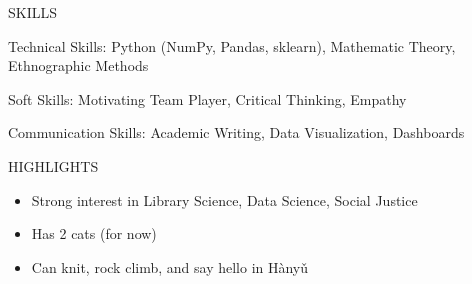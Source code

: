 \documentclass{article}
\newcommand{\sectionSpace}{\vspace{0.3in}}
\begin{document}
\sectionSpace

\begin{minipage}[t]{0.125\linewidth}
\uppercase{Skills}
\end{minipage}%
\hfill
\begin{minipage}[t]{0.85\linewidth}
Technical Skills: Python (NumPy, Pandas, sklearn), Mathematic Theory, Ethnographic Methods

Soft Skills: Motivating Team Player, Critical Thinking, Empathy

Communication Skills: Academic Writing, Data Visualization, Dashboards
\end{minipage}


\sectionSpace


\begin{minipage}[t]{0.125\linewidth}
\uppercase{Highlights}
\end{minipage}%
\hfill
\begin{minipage}[t]{0.85\linewidth}
\begin{itemize}[noitemsep,topsep=0pt]
   \item Strong interest in Library Science, Data Science, Social Justice
   \item Has 2 cats (for now)
   \item Can knit, rock climb, and say hello in Hànyǔ
 \end{itemize}

\end{minipage}
\end{document}
